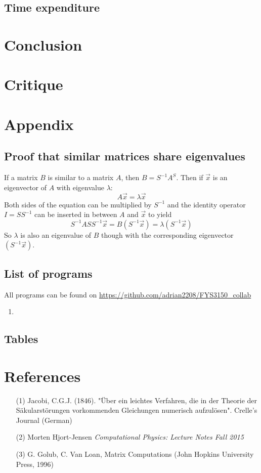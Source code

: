 \documentclass[10pt,a4paper]{article}
\begin{document}
\subsection{Time expenditure}

\section{Conclusion}

\section{Critique}

\section{Appendix}
\subsection{Proof that similar matrices share eigenvalues}\label{proof of same eigenvalues}
If a matrix $B$ is similar to a matrix $A$, then $B=S^{-1}A^S$. Then if $\vec{x}$ is an eigenvector of $A$ with eigenvalue $\lambda$:
$$
A\vec{x}=\lambda\vec{x}
$$
Both sides of the equation can be multiplied by $S^{-1}$ and the identity operator $I = SS^{-1}$ can be inserted in between $A$ and $\vec{x}$ to yield
$$
S^{-1}ASS^{-1}\vec{x} =B\left(S^{-1}\vec{x}\right)= \lambda \left( S^{-1}\vec{x}\right)
$$
So $\lambda$ is also an eigenvalue of $B$ though with the corresponding eigenvector $\left( S^{-1}\vec{x}\right)$.
\subsection{List of programs}
All programs can be found on \url{https://github.com/adrian2208/FYS3150_collab}
\begin{enumerate}
\item 
\end{enumerate}
\subsection{Tables}


\section{References}
\begin{itemize}
\item[(1)] Jacobi, C.G.J. (1846). "Über ein leichtes Verfahren, die in der Theorie der Säkularstörungen vorkommenden Gleichungen numerisch aufzulösen". Crelle's Journal (German)
\item[(2)] Morten Hjort-Jensen \textit{Computational Physics: Lecture Notes Fall 2015}
\item[(3)]G. Golub, C. Van Loan, Matrix Computations (John Hopkins University Press, 1996)
\end{itemize}
\end{document}
